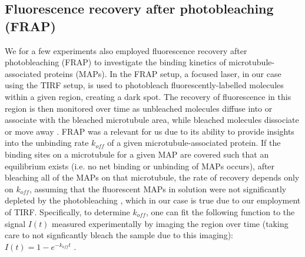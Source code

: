 \subsection{Fluorescence recovery after photobleaching (FRAP)}
\label{sec:FRAP}
We for a few experiments also employed fluorescence recovery after photobleaching (FRAP) to investigate the binding kinetics of microtubule-associated proteins (MAPs). In the FRAP setup, a focused laser, in our case using the TIRF setup, is used to photobleach fluorescently-labelled molecules within a given region, creating a dark spot. The recovery of fluorescence in this region is then monitored over time as unbleached molecules diffuse into or associate with the bleached microtubule area, while bleached molecules dissociate or move away \parencite{axelrod1976mobility}. FRAP was a relevant for us due to its ability to provide insights into the unbinding rate $k_{off}$ of a given microtubule-associated protein. If the binding sites on a microtubule for a given MAP are covered such that an equilibrium exists (i.e. no net binding or unbinding of MAPs occurs), after bleaching all of the MAPs on that microtubule, the rate of recovery depends only on $k_{off}$, assuming that the fluorescent MAPs in solution were not significantly depleted by the photobleaching \parencite{bulinski2001rapid}, which in our case is true due to our employment of TIRF. Specifically, to determine $k_{off}$, one can fit the following function to the signal $I(t)$ measured experimentally by imaging the region over time (taking care to not signficantly bleach the sample due to this imaging): $I(t)=1-e^{-k_{off}t}$ \parencite{bulinski2001rapid}.